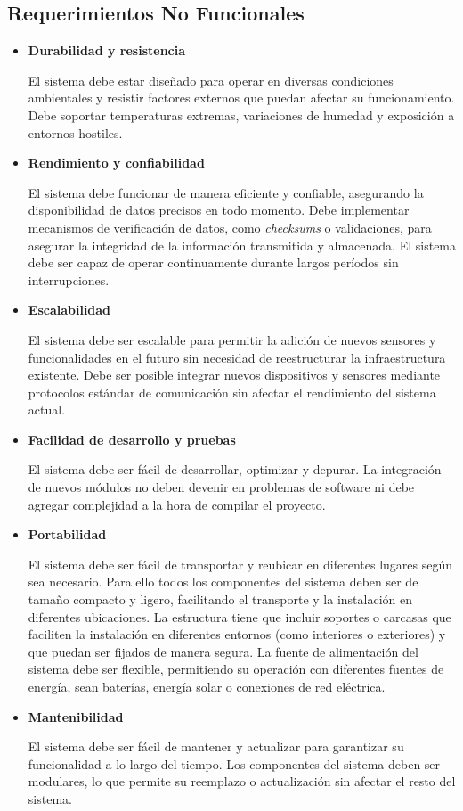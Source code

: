 \subsection{Requerimientos No Funcionales}
\begin{itemize}
    \item \textbf{Durabilidad y resistencia}
    
    El sistema debe estar diseñado para operar en diversas condiciones ambientales y resistir factores externos que puedan afectar su funcionamiento.
    Debe soportar temperaturas extremas, variaciones de humedad y exposición a entornos hostiles.

    \item \textbf{Rendimiento y confiabilidad}
    
    El sistema debe funcionar de manera eficiente y confiable, asegurando la disponibilidad de datos precisos en todo momento.
    Debe implementar mecanismos de verificación de datos, como \textit{checksums} o validaciones, para asegurar la integridad de la información transmitida y almacenada.
    El sistema debe ser capaz de operar continuamente durante largos períodos sin interrupciones.

    \item \textbf{Escalabilidad}
    
    El sistema debe ser escalable para permitir la adición de nuevos sensores y funcionalidades en el futuro sin necesidad de reestructurar la infraestructura existente.
    Debe ser posible integrar nuevos dispositivos y sensores mediante protocolos estándar de comunicación sin afectar el rendimiento del sistema actual.

    \item \textbf{Facilidad de desarrollo y pruebas}

    El sistema debe ser fácil de desarrollar, optimizar y depurar. La integración de nuevos módulos no deben devenir en problemas de software ni debe agregar complejidad a la hora de compilar el proyecto. 

    \item \textbf{Portabilidad}
    
    El sistema debe ser fácil de transportar y reubicar en diferentes lugares según sea necesario. Para ello todos los componentes del sistema deben ser de tamaño compacto y ligero, facilitando el transporte y la instalación en diferentes ubicaciones.
    La estructura tiene que incluir soportes o carcasas que faciliten la instalación en diferentes entornos (como interiores o exteriores) y que puedan ser fijados de manera segura.
    La fuente de alimentación del sistema debe ser flexible, permitiendo su operación con diferentes fuentes de energía, sean baterías, energía solar o conexiones de red eléctrica.

    \item \textbf{Mantenibilidad}
    
    El sistema debe ser fácil de mantener y actualizar para garantizar su funcionalidad a lo largo del tiempo.
    Los componentes del sistema deben ser modulares, lo que permite su reemplazo o actualización sin afectar el resto del sistema.


\end{itemize}



